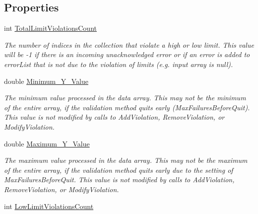 \subsection*{Properties}
\begin{DoxyCompactItemize}
\item 
int \mbox{\hyperlink{struct_c_s_i_1_1_library_1_1_array_utilities_1_1_array_limit_checks_1_1_violations_info_a26350e4da354b988868679d7edb7f3a8}{Total\+Limit\+Violations\+Count}}
\begin{DoxyCompactList}\small\item\em The number of indices in the collection that violate a high or low limit. This value will be -\/1 if there is an incoming unacknowledged error or if an error is added to error\+List that is not due to the violation of limits (e.\+g. input array is null). \end{DoxyCompactList}\item 
double \mbox{\hyperlink{struct_c_s_i_1_1_library_1_1_array_utilities_1_1_array_limit_checks_1_1_violations_info_a1f5e002ded758075e254d8e2745fb4a8}{Minimum\+\_\+\+Y\+\_\+\+Value}}
\begin{DoxyCompactList}\small\item\em The minimum value processed in the data array. This may not be the minimum of the entire array, if the validation method quits early (Max\+Failures\+Before\+Quit). This value is not modified by calls to Add\+Violation, Remove\+Violation, or Modify\+Violation. \end{DoxyCompactList}\item 
double \mbox{\hyperlink{struct_c_s_i_1_1_library_1_1_array_utilities_1_1_array_limit_checks_1_1_violations_info_acee7fa4ab2959cec2444b527af463ad6}{Maximum\+\_\+\+Y\+\_\+\+Value}}
\begin{DoxyCompactList}\small\item\em The maximum value processed in the data array. This may not be the maximum of the entire array, if the validation method quits early due to the setting of Max\+Failures\+Before\+Quit. This value is not modified by calls to Add\+Violation, Remove\+Violation, or Modify\+Violation. \end{DoxyCompactList}\item 
int \mbox{\hyperlink{struct_c_s_i_1_1_library_1_1_array_utilities_1_1_array_limit_checks_1_1_violations_info_abb02446728d60d09ecc19f00408fd2fa}{Low\+Limit\+Violations\+Count}}

\end{DoxyCompactItemize}
